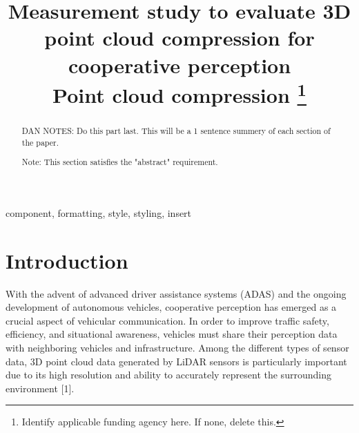 \documentclass[conference]{IEEEtran}
\begin{document}
\title{Measurement study to evaluate 3D point cloud compression for cooperative perception\\
{\footnotesize Point cloud compression}
\thanks{Identify applicable funding agency here. If none, delete this.}
}

\author{
    \and
}

\maketitle

\begin{abstract}
    DAN NOTES: Do this part last. This will be a 1 sentence summery of each section of the paper.

    Note: This section satisfies the "abstract" requirement.
\end{abstract}

\begin{IEEEkeywords}
    component, formatting, style, styling, insert
\end{IEEEkeywords}

\section{Introduction}

With the advent of advanced driver assistance systems (ADAS) and the ongoing development of autonomous vehicles, cooperative perception has emerged as a crucial aspect of vehicular communication. In order to improve traffic safety, efficiency, and situational awareness, vehicles must share their perception data with neighboring vehicles and infrastructure. Among the different types of sensor data, 3D point cloud data generated by LiDAR sensors is particularly important due to its high resolution and ability to accurately represent the surrounding environment [1].
\end{document}
